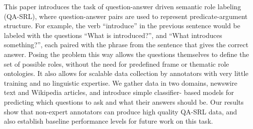 This paper introduces the task of question-answer driven semantic role labeling (QA-SRL), where question-answer pairs are used to represent predicate-argument structure. For example, the verb ``introduce'' in the previous sentence would be labeled with the questions ``What is introduced?'', and ``What introduces something?'', each paired with the phrase from the sentence that gives the correct answer. Posing the problem this way allows the questions themselves to define the set of possible roles, without the need for predefined frame or thematic role ontologies. It also allows for scalable data collection by annotators with very little training and no linguistic expertise. We gather data in two domains, newswire text and Wikipedia articles, and introduce simple classifier- based models for predicting which questions to ask and what their answers should be. Our results show that non-expert annotators can produce high quality QA-SRL data, and also establish baseline performance levels for future work on this task.
